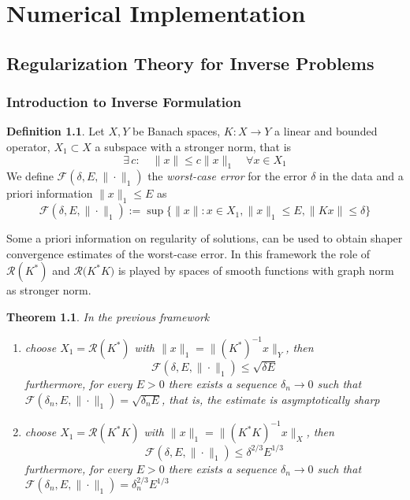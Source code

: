\documentclass[10pt, a4paper, twoside, openright]{book}
\theoremstyle{definition}
\newtheorem{definition}[subsection]{Definition}
\theoremstyle{plain}
\newtheorem{theorem}[subsection]{Theorem}
\theoremstyle{plain}
\theoremstyle{plain}
\theoremstyle{plain}
\theoremstyle{plain}
\theoremstyle{plain}
\theoremstyle{plain}
\theoremstyle{plain}
\begin{document}
\chapter{Numerical Implementation}
\section{Regularization Theory for Inverse Problems}
\subsection{Introduction to Inverse Formulation}
\begin{definition}
 Let $X,Y$ be Banach spaces, $K:X\to Y$ a linear and bounded operator, $X_1\subset X$ a subspace with a stronger norm, that is
 \begin{equation}
  \exists \, c:\quad \|x\|\leq c\|x\|_1\quad\forall x\in X_1
 \end{equation}
 We define $\mathcal{F}(\delta, E, \|\cdot\|_1)$ the \emph{worst-case error} for the error $\delta$ in the data and a priori information $\|x\|_1\leq E$ as
 \begin{equation}
  \mathcal{F}(\delta, E, \|\cdot\|_1):= \sup\Big\{\|x\|:x\in X_1, \|x\|_1 \leq E, \|Kx\|\leq\delta\Big\}
 \end{equation}
\end{definition}
Some a priori information on regularity of solutions, can be used to obtain shaper convergence estimates of the worst-case error. In this framework the role of $\mathcal{R}(K^*)$ and $\mathcal{R}({K^*K)}$ is played by spaces of smooth functions with graph norm as stronger norm.
\begin{theorem}
 In the previous framework
 \begin{enumerate}
  \item choose $X_1=\mathcal{R}(K^*)$ with $\|x\|_1=\|(K^*)^{-1}x\|_Y$, then
  \begin{equation}
   \mathcal{F}(\delta, E, \|\cdot\|_1)\leq \sqrt{\delta E}
  \end{equation}
  furthermore, for every $E>0$ there exists a sequence $\delta_n\to 0$ such that $\mathcal{F}(\delta_n, E, \|\cdot\|_1) = \sqrt{\delta_n E}$, that is, the estimate is asymptotically sharp
  \item choose $X_1=\mathcal{R}(K^*K)$ with $\|x\|_1=\|(K^*K)^{-1}x\|_X$, then
  \begin{equation}
   \mathcal{F}(\delta, E, \|\cdot\|_1)\leq \delta^{2/3} E^{1/3}
  \end{equation}
  furthermore, for every $E>0$ there exists a sequence $\delta_n\to 0$ such that $\mathcal{F}(\delta_n, E, \|\cdot\|_1) = \delta_n^{2/3} E^{1/3}$
 \end{enumerate}
\end{theorem}
\end{document}
